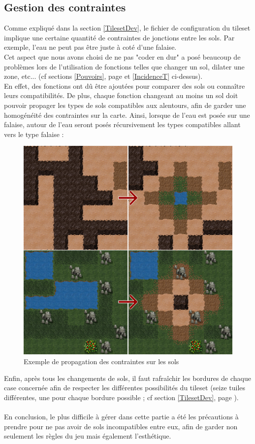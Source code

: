 \documentclass[a4paper]{memoir}
\begin{document}
			\subsection{Gestion des contraintes}
				Comme expliqué dans la section \ref{TilesetDev}, le fichier de configuration du tileset implique une certaine quantité de contraintes de jonctions entre les sols. Par exemple, l'eau ne peut pas être juste à coté d'une falaise.\\
				Cet aspect que nous avons choisi de ne pas "coder en dur" a posé beaucoup de problèmes lors de l'utilisation de fonctions telles que changer un sol, dilater une zone, etc... (cf sections \ref{Pouvoirs}, page \pageref{Pouvoirs} et \ref{IncidenceT} ci-dessus).\\
				En effet, des fonctions ont dû être ajoutées pour comparer des sols ou connaître leurs compatibilités. De plus, chaque fonction changeant au moins un sol doit pouvoir propager les types de sols compatibles aux alentours, afin de garder une homogénéité des contraintes sur la carte. Ainsi, lorsque de l'eau est posée sur une falaise, autour de l'eau seront posés récursivement les types compatibles allant vers le type falaise :\\
				\begin{figure}[H]
					\begin{center}
						\includegraphics[scale=0.5]{img/spreadGround.png} 
					\end{center}
					\label{fig:spread}
					\caption{Exemple de propagation des contraintes sur les sols}
				\end{figure}
				Enfin, après tous les changements de sols, il faut rafraîchir les bordures de chaque case concernée afin de respecter les différentes possibilités du tileset (seize tuiles différentes, une pour chaque bordure possible ; cf section \ref{TilesetDev}, page \pageref{TilesetDev}).\\
				\\
				En conclusion, le plus difficile à gérer dans cette partie a été les précautions à prendre pour ne pas avoir de sols incompatibles entre eux, afin de garder non seulement les règles du jeu mais également l'esthétique.
\end{document}
